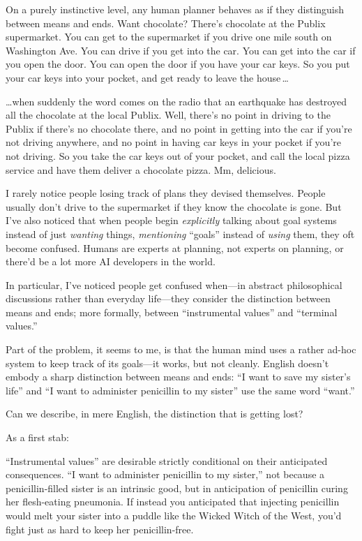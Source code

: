 \myendsectiontext


\bigskip



 On a purely instinctive level, any human planner behaves as if
they distinguish between means and ends. Want chocolate?
There's chocolate at the Publix supermarket. You can
get to the supermarket if you drive one mile south on Washington Ave.
You can drive if you get into the car. You can get into the car if you
open the door. You can open the door if you have your car keys. So you
put your car keys into your pocket, and get ready to leave the house\,\ldots 


 \ldots when suddenly the word comes on the radio that an earthquake
has destroyed all the chocolate at the local Publix. Well,
there's no point in driving to the Publix if
there's no chocolate there, and no point in getting
into the car if you're not driving anywhere, and no
point in having car keys in your pocket if you're not
driving. So you take the car keys out of your pocket, and call the
local pizza service and have them deliver a chocolate pizza. Mm,
delicious.


 I rarely notice people losing track of plans they devised
themselves. People usually don't drive to the
supermarket if they know the chocolate is gone. But
I've also noticed that when people begin
\textit{explicitly} talking about goal systems instead of just
\textit{wanting} things, \textit{mentioning}
``goals'' instead of \textit{using}
them, they oft become confused. Humans are experts at planning, not
experts on planning, or there'd be a lot more AI
developers in the world.


 In particular, I've noticed people get confused
when---in abstract philosophical discussions rather than everyday
life---they consider the distinction between means and ends; more
formally, between ``instrumental
values'' and ``terminal
values.''


 Part of the problem, it seems to me, is that the human mind uses a
rather ad-hoc system to keep track of its goals---it works, but not
cleanly. English doesn't embody a sharp distinction
between means and ends: ``I want to save my
sister's life'' and
``I want to administer penicillin to my
sister'' use the same word
``want.''


 Can we describe, in mere English, the distinction that is getting
lost?


 As a first stab:


 ``Instrumental values'' are
desirable strictly conditional on their anticipated consequences.
``I want to administer penicillin to my
sister,'' not because a penicillin-filled sister is
an intrinsic good, but in anticipation of penicillin curing her
flesh-eating pneumonia. If instead you anticipated that injecting
penicillin would melt your sister into a puddle like the Wicked Witch
of the West, you'd fight just as hard to keep her
penicillin-free.


